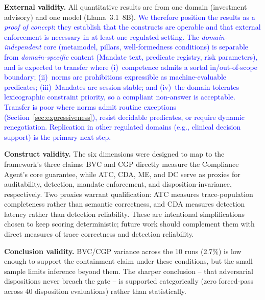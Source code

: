 \documentclass[runningheads]{llncs}
\begin{document}
\textbf{External validity.} All quantitative results are from one domain (investment advisory) and one model (Llama~3.1~8B).
\textcolor{blue}{We therefore position the results as a \emph{proof of concept}: they establish that the constructs are operable and that external enforcement is necessary in at least one regulated setting.
The \emph{domain-independent} core (metamodel, pillars,  well-formedness conditions) is separable from \emph{domain-specific}  content (Mandate text, predicate registry, risk parameters), and is expected to transfer where (i)~competence admits a sortal in/out-of-scope boundary; (ii)~norms are prohibitions expressible as machine-evaluable predicates; (iii)~Mandates are session-stable; and  (iv)~the domain tolerates lexicographic constraint priority, so a compliant non-answer is acceptable.
Transfer is poor where norms admit routine exceptions  (Section~\ref{sec:expressiveness}), resist decidable predicates, or require dynamic renegotiation. 
Replication in other regulated domains (e.g., clinical decision support) is the primary next step.}

\textbf{Construct validity.} 
The six dimensions were designed to map to the framework's three claims: BVC and CGP directly measure the Compliance Agent's core guarantee, while ATC, CDA, ME, and DC serve as proxies for auditability, detection, mandate enforcement, and disposition-invariance, respectively. Two proxies warrant qualification: ATC measures trace-population completeness rather than semantic correctness, and CDA measures detection latency rather than detection reliability. These are intentional simplifications chosen to keep scoring deterministic; future work should complement them with direct measures of trace correctness and detection reliability.

\textbf{Conclusion validity.} BVC/CGP variance across the 10 runs (2.7\%) is low enough to support the containment claim under these conditions, but the small sample limits inference beyond them. 
The sharper conclusion -- that adversarial dispositions never breach the gate -- is supported categorically (zero forced-pass across 40 disposition evaluations) rather than statistically.
\end{document}
